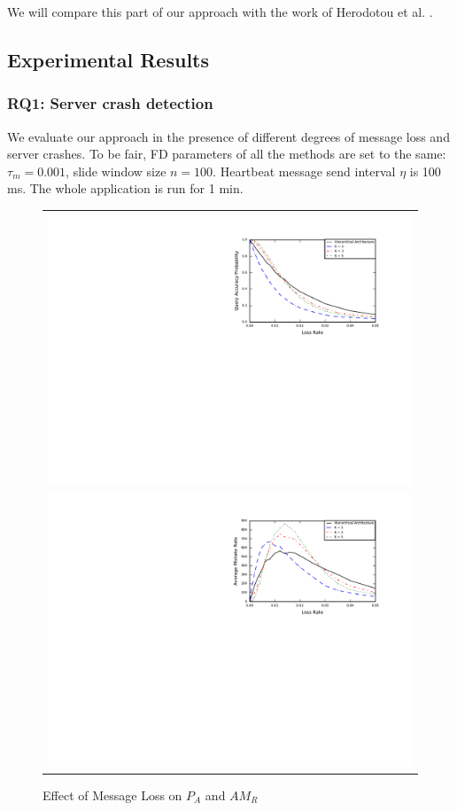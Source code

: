 \documentclass{sig-alternate-05-2015}
\begin{document}
We will compare this part of our approach with the work of Herodotou et al. \cite{herodotou2014scalable}.

\subsection{Experimental Results}

\subsubsection*{RQ1: Server crash detection}
\quad We evaluate our approach in the presence of different degrees of message loss and server crashes. To be fair, FD parameters of all the methods are set to the same: $\tau_m=0.001$, slide window size $n=100$. Heartbeat message send interval $\eta$ is 100 ms. The whole application is run for 1 min.

\begin{figure}[t]
  \centering
  \begin{tabular}{c}
  \includegraphics[scale=0.7]{r1} \\
  \includegraphics[scale=0.7]{r2}
  \end{tabular}
  \caption{Effect of Message Loss on $P_A$ and $AM_R$}
\end{figure}
\end{document}
